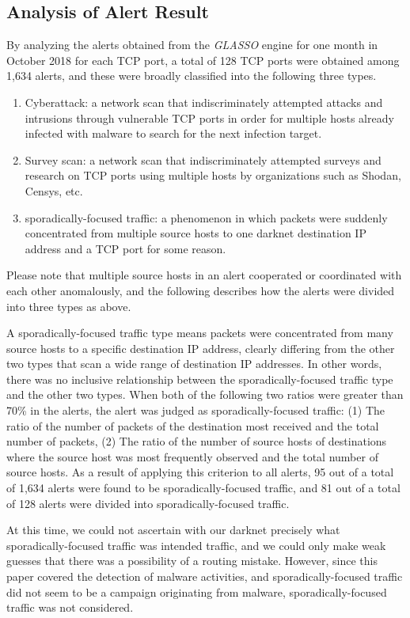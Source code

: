 \documentclass[conference]{IEEEtran}
\begin{document}
\subsection{Analysis of Alert Result}
\label{Analysis}
By analyzing the alerts obtained from the \textit{GLASSO} engine for one month in October 2018 for each TCP port, a total of 128 TCP ports were obtained among 1,634 alerts, and these were broadly classified into the following three types.
\begin{enumerate}
  \item Cyberattack: a network scan that indiscriminately attempted attacks and intrusions through vulnerable TCP ports in order for multiple hosts already infected with malware to search for the next infection target.
  \item Survey scan: a network scan that indiscriminately attempted surveys and research on TCP ports using multiple hosts by organizations such as Shodan, Censys, etc.
  \item sporadically-focused traffic: a phenomenon in which packets were suddenly concentrated from multiple source hosts to one darknet destination IP address and a TCP port for some reason.
\end{enumerate}
Please note that multiple source hosts in an alert cooperated or coordinated with each other anomalously, and the following describes how the alerts were divided into three types as above.


A sporadically-focused traffic type means packets were concentrated from many source hosts to a specific destination IP address, clearly differing from the other two types that scan a wide range of destination IP addresses.
In other words, there was no inclusive relationship between the sporadically-focused traffic type and the other two types.
When both of the following two ratios were greater than 70\% in the alerts, the alert was judged as sporadically-focused traffic: (1) The ratio of the number of packets of the destination most received and the total number of packets, (2) The ratio of the number of source hosts of destinations where the source host was most frequently observed and the total number of source hosts.
As a result of applying this criterion to all alerts, 95 out of a total of 1,634 alerts were found to be sporadically-focused traffic, and 81 out of a total of 128 alerts were divided into sporadically-focused traffic.

At this time, we could not ascertain with our darknet precisely what sporadically-focused traffic was intended traffic, and we could only make weak guesses that there was a possibility of a routing mistake.
However, since this paper covered the detection of malware activities, and sporadically-focused traffic did not seem to be a campaign originating from malware, sporadically-focused traffic was not considered.
\end{document}
